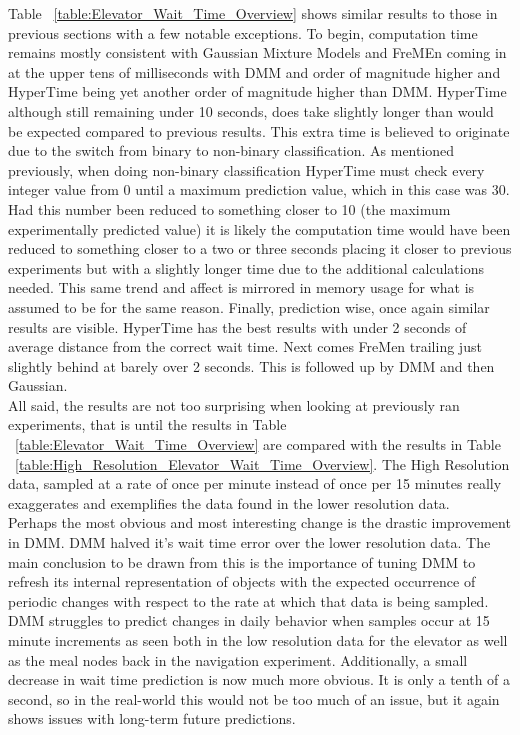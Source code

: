 Table ~\ref{table:Elevator_Wait_Time_Overview} shows similar results to those
in previous sections with a few notable exceptions. To begin, computation time
remains mostly consistent with Gaussian Mixture Models and FreMEn coming in at
the upper tens of milliseconds with DMM and order of magnitude higher and
HyperTime being yet another order of magnitude higher than DMM. HyperTime
although still remaining under 10 seconds, does take slightly longer than would
be expected compared to previous results. This extra time is believed to originate
due to the switch from binary to non-binary classification. As mentioned previously,
when doing non-binary classification HyperTime must check every integer value
from 0 until a maximum prediction value, which in this case was 30. Had this
number been reduced to something closer to 10 (the maximum experimentally
predicted value) it is likely the computation time would have been reduced to
something closer to a two or three seconds placing it closer to previous
experiments but with a slightly longer time due to the additional calculations
needed. This same trend and affect is mirrored in memory usage for what is
assumed to be for the same reason. Finally, prediction wise, once again
similar results are visible. HyperTime has the best results with under 2
seconds of average distance from the correct wait time. Next comes FreMen
trailing just slightly behind at barely over 2 seconds. This is followed up
by DMM and then Gaussian. \\

All said, the results are not too surprising when looking at previously ran
experiments, that is until the results in Table
~\ref{table:Elevator_Wait_Time_Overview} are compared with the results in Table
~\ref{table:High_Resolution_Elevator_Wait_Time_Overview}. The High Resolution
data, sampled at a rate of once per minute instead of once per 15 minutes really
exaggerates and exemplifies the data found in the lower resolution data. \\

Perhaps the most obvious and most interesting change is the drastic improvement
in DMM. DMM halved it's wait time error over the lower resolution data.
The main conclusion to be drawn from this is the importance of tuning DMM
to refresh its internal representation of objects with the expected occurrence
of periodic changes with respect to the rate at which that data is being
sampled. DMM struggles to predict changes in daily behavior when samples
occur at 15 minute increments as seen both in the low resolution data for the
elevator as well as the meal nodes back in the navigation experiment.
Additionally, a small decrease in wait time prediction is now much more obvious.
It is only a tenth of a second, so in the real-world this would not be too much
of an issue, but it again shows issues with long-term future predictions.

